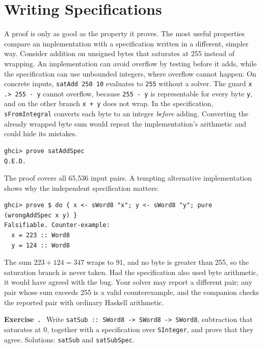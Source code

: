 \documentclass[acmsmall,screen,review,anonymous,nonacm]{acmart}
\newcommand{\code}[1]{\texttt{#1}}
\newcounter{exercise}
\newenvironment{exercise}{\refstepcounter{exercise}\par\medskip\noindent
  \textbf{Exercise~\theexercise.}\ }{\par\medskip}
\begin{document}
\section{Writing Specifications}
\label{sec:specs}

A proof is only as good as the property it proves. The most useful properties
compare an implementation with a specification written in a different, simpler
way. Consider addition on unsigned bytes that saturates at 255 instead of
wrapping. An implementation can avoid overflow by testing before it adds, while
the specification can use unbounded integers, where overflow cannot happen:
On concrete inputs, \code{satAdd 250 10} evaluates to \code{255} without a solver.
The guard \code{x .> 255 - y} cannot overflow, because \code{255 - y} is
representable for every byte \code{y}, and on the other branch \code{x + y} does
not wrap. In the specification, \code{sFromIntegral} converts each byte to an
integer \emph{before} adding. Converting the already wrapped byte sum would
repeat the implementation's arithmetic and could hide its mistakes.
\begin{lstlisting}
ghci> prove satAddSpec
Q.E.D.
\end{lstlisting}
The proof covers all 65,536 input pairs. A tempting alternative implementation
shows why the independent specification matters:
\begin{lstlisting}[style=output]
ghci> prove $ do { x <- sWord8 "x"; y <- sWord8 "y"; pure (wrongAddSpec x y) }
Falsifiable. Counter-example:
  x = 223 :: Word8
  y = 124 :: Word8
\end{lstlisting}
The sum $223+124=347$ wraps to 91, and no byte is greater than 255, so the
saturation branch is never taken. Had the specification also used byte
arithmetic, it would have agreed with the bug. Your solver may report a different
pair; any pair whose sum exceeds 255 is a valid counterexample, and the companion
checks the reported pair with ordinary Haskell arithmetic.

\begin{exercise}
Write \code{satSub :: SWord8 -> SWord8 -> SWord8}, subtraction that saturates
at 0, together with a specification over \code{SInteger}, and prove that they
agree. Solutions: \code{satSub} and \code{satSubSpec}.
\end{exercise}

\end{document}
